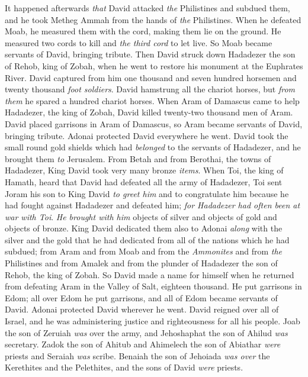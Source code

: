 \begin{biblechapter} %
 It happened afterwards \textit{that} David attacked \textit{the} Philistines and subdued them, and he took Metheg Ammah from the hands of \textit{the} Philistines.
\verse When he defeated Moab, he measured them with the cord, making them lie on the ground. He measured two cords to kill and \textit{the third cord} to let live. So Moab became servants of David, bringing tribute.
\verse Then David struck down Hadadezer the son of Rehob, king of Zobah, when he went to restore his monument at the Euphrates River.
\verse David captured from him one thousand and seven hundred horsemen and twenty thousand \textit{foot soldiers}. David hamstrung all the chariot horses, but \textit{from them} he spared a hundred chariot horses.
\verse When Aram of Damascus came to help Hadadezer, the king of Zobah, David killed twenty-two thousand men of Aram.
\verse David placed garrisons in Aram of Damascus, so Aram became servants of David, bringing tribute. Adonai protected David everywhere he went.
\verse David took the small round gold shields which had \textit{belonged} to the servants of Hadadezer, and he brought them \textit{to} Jerusalem.
\verse From Betah and from Berothai, the towns of Hadadezer, King David took very many bronze \textit{items}.
\verse When Toi, the king of Hamath, heard that David had defeated all the army of Hadadezer,
\verse Toi sent Joram his son to King David \textit{to greet him} and to congratulate him because he had fought against Hadadezer and defeated him; \textit{for Hadadezer had often been at war with Toi}. \textit{He brought with him} objects of silver and objects of gold and objects of bronze.
\verse King David dedicated them also to Adonai \textit{along} with the silver and the gold that he had dedicated from all of the nations which he had subdued;
\verse from Aram and from Moab and from the \textit{Ammonites} and from \textit{the} Philistines and from Amalek and from the plunder of Hadadezer the son of Rehob, the king of Zobah.
\verse So David made a name for himself when he returned from defeating Aram in the Valley of Salt, eighteen thousand.
\verse He put garrisons in Edom; all over Edom he put garrisons, and all of Edom became servants of David. Adonai protected David wherever he went.
\verse David reigned over all of Israel, and he was administering justice and righteousness for all his people.
\verse Joab the son of Zeruiah \textit{was} over the army, and Jehoshaphat the son of Ahilud \textit{was} secretary.
\verse Zadok the son of Ahitub and Ahimelech the son of Abiathar \textit{were} priests and Seraiah \textit{was} scribe.
\verse Benaiah the son of Jehoiada \textit{was over} the Kerethites and the Pelethites, and the sons of David \textit{were} priests.
\end{biblechapter}

